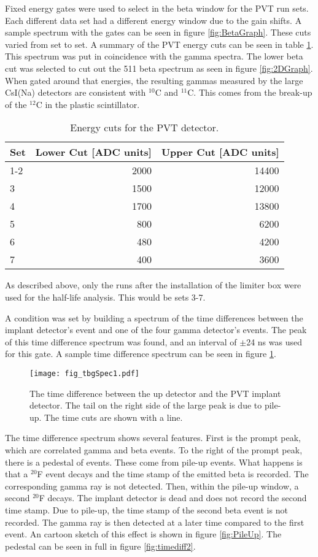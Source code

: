 \documentclass[MaxHughesThesis.tex]{subfiles}
\begin{document}
Fixed energy gates were used to select in the beta window for the PVT run sets.
Each different data set had a different energy window due to the gain shifts.
A sample spectrum with the gates can be seen in figure \ref{fig:BetaGraph}.
These cuts varied from set to set.
A summary of the PVT energy cuts can be seen in table \ref{tab:PVTCuts}.
This spectrum was put in coincidence with the gamma spectra. 
The lower beta cut was selected to cut out the 511 beta spectrum as seen in figure \ref{fig:2DGraph}.
When gated around that energies, the resulting gammas measured by the large CsI(Na) detectors are consistent with $^{10}$C and $^{11}$C.
This comes from the break-up of the $^{12}$C in the plastic scintillator. 

\begin{table}[!htb]
	\centering
	\caption{Energy cuts for the PVT detector.}
	\begin{tabular}{lrr}
	Set & Lower Cut [ADC units] & Upper Cut [ADC units] \\ \hline
	1-2 & 2000 & 14400 \\
	3 & 1500 & 12000\\
	4 & 1700 & 13800 \\
	5 & 800 & 6200 \\
	6 & 480 & 4200 \\
	7 & 400 & 3600
	\end{tabular}
	\label{tab:PVTCuts}
\end{table}
As described above, only the runs after the installation of the limiter box were used for the half-life analysis. 
This would be sets 3-7.

A condition was set by building a spectrum of the time differences between the implant detector's event and one of the four gamma detector's events. 
The peak of this time difference spectrum was found, and an interval of $\pm$24 ns was used for this gate.
A sample time difference spectrum can be seen in figure \ref{fig:timediff}.

\begin{figure}
	\centerline{\texttt{[image: fig\_tbgSpec1.pdf]}}	
	\caption{The time difference between the up detector and the PVT implant detector.
		The tail on the right side of the large peak is due to pile-up.
		The time cuts are shown with a line.}
	\label{fig:timediff}
\end{figure}

The time difference spectrum shows several features.
First is the prompt peak, which are correlated gamma and beta events. 
To the right of the prompt peak, there is a pedestal of events.
These come from pile-up events.
What happens is that a $^{20}$F event decays and the time stamp of the emitted beta is recorded.
The corresponding gamma ray is not detected.
Then, within the pile-up window, a second $^{20}$F decays.  
The implant detector is dead and does not record the second time stamp.
Due to pile-up, the time stamp of the second beta event is not recorded.
The gamma ray is then detected at a later time compared to the first event.
An cartoon sketch of this effect is shown in figure \ref{fig:PileUp}.
The pedestal can be seen in full in figure \ref{fig:timediff2}.
\end{document}
